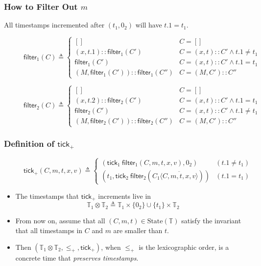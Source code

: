\documentclass{beamer}
\newcommand*{\cons}{::}
\newcommand*{\Time}{\mathbb{T}}
\newcommand*{\mem}{m}
\newcommand*{\State}[1]{\text{State}({#1})}
\newcommand*{\tick}{\mathsf{tick}}
\newcommand*{\delete}[2]{{#1}\overline{\langle{#2}\rangle}}
\newcommand*{\filter}{\mathsf{filter}}
\begin{document}
\begin{frame}[c]
  \frametitle{How to Filter Out $\mem$}
  All timestamps incremented after $(t_1,0_2)$ will have $t.1=t_1$.
  \begin{figure}[h!]
    \footnotesize
    \[
      \filter_1(C)\triangleq
      \begin{cases}
        []                                   & C=[]                              \\
        (x,t.1)\cons\filter_1(C')            & C=(x,t)\cons C'\wedge t.1\neq t_1 \\
        \filter_1(C')                        & C=(x,t)\cons C'\wedge t.1=t_1     \\
        (M,\filter_1(C'))\cons\filter_1(C'') & C=(M, C')\cons C''
      \end{cases}
    \]

    \[
      \filter_2(C)\triangleq
      \begin{cases}
        []                                   & C=[]                              \\
        (x,t.2)\cons\filter_2(C')            & C=(x,t)\cons C'\wedge t.1=t_1     \\
        \filter_2(C')                        & C=(x,t)\cons C'\wedge t.1\neq t_1 \\
        (M,\filter_2(C'))\cons\filter_2(C'') & C=(M, C')\cons C''
      \end{cases}
    \]
  \end{figure}
\end{frame}
\begin{frame}[c]
  \frametitle{Definition of $\tick_+$}
  \begin{figure}[h!]
    \footnotesize
    \[
      \tick_{+}({C},\mem,{t},x,{v})\triangleq
      \begin{cases}
        (\tick_1\:\filter_1(C,\mem,t,x,v), 0_2)                   & (t.1\neq t_1) \\
        (t_1,\tick_2\:\filter_2(\delete{C_1}{C,\mem, {t},x,{v}})) & (t.1=t_1)
      \end{cases}
    \]
  \end{figure}
  \begin{itemize}
    \item The timestamps that $\tick_+$ increments live in
          \[\Time_1\otimes\Time_2\triangleq\Time_1\times\{0_2\}\cup\{t_1\}\times\Time_2\]
    \item From now on, assume that all $(C,\mem,t)\in\State{\Time}$ satisfy the invariant that all timestamps in $C$ and $\mem$ are smaller than $t$.
    \item Then $(\Time_1\otimes\Time_2,\le_+,\tick_+)$, when $\le_+$ is the lexicographic order, is a concrete time that \emph{preserves timestamps}.
  \end{itemize}
\end{frame}
\end{document}
